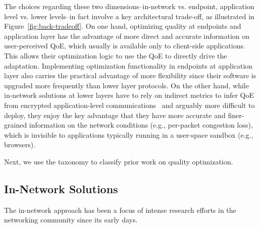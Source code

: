 The choices regarding these two dimensions--in-network vs. endpoint, 
application level vs. lower levels--in fact involve a key architectural trade-off,
as illustrated in Figure~\ref{fig:back-tradeoff}.
On one hand, optimizing quality at endpoints and application layer 
has the advantage of more direct and accurate information on user-perceived 
QoE, which usually is available only to client-side applications.
This allows their optimization logic to use the QoE to directly drive
the adaptation.
Implementing optimization functionality in endpoints at application layer
also carries the practical advantage of more flexibility since 
their software is upgraded
more frequently than lower layer protocols.
On the other hand, while in-network solutions at lower layers have to rely 
on indirect metrics to infer QoE from encrypted application-level 
communications~\cite{mobicom2014-qos,
hotmobile2014-prometheus,imc2012-firstbyte} 
and arguably more difficult to deploy, 
they enjoy the key advantage that they have more accurate and finer-grained 
information on the network conditions (e.g., per-packet congestion loss), 
which is invisible to applications typically running in a user-space sandbox 
(e.g., browsers).


Next, we use the taxonomy to classify prior work on quality optimization.

\subsection{In-Network Solutions}
The in-network approach has been a
focus of intense research efforts in the networking community 
since its early days.


